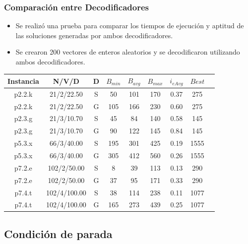 \documentclass{beamer}
\begin{document}
\begin{frame}
\frametitle{Comparación entre Decodificadores}

\begin{itemize}
    \item Se realizó una prueba para comparar los tiempos de ejecución y aptitud de las soluciones generadas por ambos decodificadores.
    \pause
    \item Se crearon 200 vectores de enteros aleatorios y se decodificaron utilizando ambos decodificadores.
    \pause
\end{itemize}

\begin{table}
\begin{center}
\begin{tabular}{ |c|c|c|c|c|c|c|c|c| } 
\hline
Instancia & N/V/D & D & $B_{min}$ & $B_{avg}$ & $B_{max}$ & $i_{eAvg}$ & $Best$ \\
\hline
p2.2.k & 21/2/22.50 & S & 50 & 101 & 170 & 0.37 & 275 \\
p2.2.k & 21/2/22.50 & G & 105 & 166 & 230 & 0.60 & 275 \\
p2.3.g & 21/3/10.70 & S & 45 & 84 & 140 & 0.58 & 145 \\
p2.3.g & 21/3/10.70 & G & 90 & 122 & 145 & 0.84 & 145 \\
p5.3.x & 66/3/40.00 & S & 195 & 301 & 425 & 0.19 & 1555 \\
p5.3.x & 66/3/40.00 & G & 305 & 412 & 560 & 0.26 & 1555 \\
p7.2.e & 102/2/50.00 & S & 8 & 39 & 113 & 0.13 & 290 \\
p7.2.e & 102/2/50.00 & G & 37 & 95 & 171 & 0.33 & 290 \\
p7.4.t & 102/4/100.00 & S & 38 & 114 & 238 & 0.11 & 1077 \\
p7.4.t & 102/4/100.00 & G & 165 & 273 & 439 & 0.25 & 1077 \\
\hline
\end{tabular}
\end{center}
\label{tab:resultadosDecoSimple}
\end{table}


\end{frame}


\subsection{Condición de parada}
\end{document}
